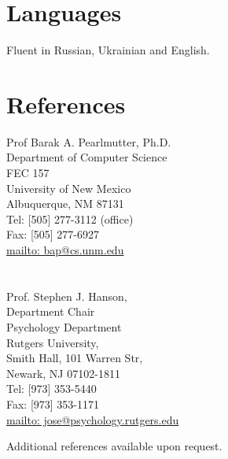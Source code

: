 \documentclass[10pt,overlapped,line]{res}
\begin{document}
\begin{resume}
\section{Languages}
Fluent in Russian, Ukrainian and English. 


\section{References}
 \begin{multicols}{2}
{\small
   Prof Barak A. Pearlmutter, Ph.D. \\
   Department of Computer Science \\
   FEC 157 \\
   University of New Mexico \\
   Albuquerque, NM  87131 \\
   Tel: [505] 277-3112 (office) \\
   Fax: [505] 277-6927 \\
   \href{URL}{mailto: bap@cs.unm.edu} \\
\\
\\
   Prof. Stephen J. Hanson, \\
   Department Chair \\
   Psychology Department \\
   Rutgers University, \\
   Smith Hall, 101 Warren Str, \\
   Newark, NJ 07102-1811 \\
   Tel: [973] 353-5440 \\
   Fax: [973] 353-1171 \\
   \href{URL}{mailto: jose@psychology.rutgers.edu} \\
}
\end{multicols}

Additional references available upon request.



\end{resume}
\end{document}
